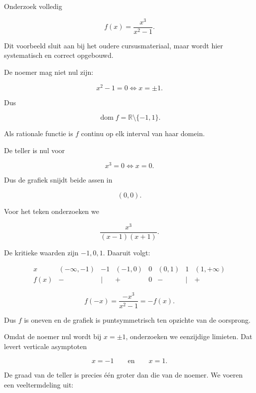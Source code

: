 \documentclass{ximera}
\begin{document}


Onderzoek volledig

\[
f(x)=\frac{x^3}{x^2-1}.
\]

Dit voorbeeld sluit aan bij het oudere cursusmateriaal, maar wordt hier
systematisch en correct opgebouwd.


De noemer mag niet nul zijn:

\[
x^2-1=0
\Longleftrightarrow
x=\pm1.
\]

Dus

\[
\boxed{\operatorname{dom}f=\mathbb{R}\setminus\{-1,1\}.}
\]

Als rationale functie is \(f\) continu op elk interval van haar domein.


De teller is nul voor

\[x^3=0\Longleftrightarrow x=0.\]

Dus de grafiek snijdt beide assen in

\[\boxed{(0,0)}.\]

Voor het teken onderzoeken we

\[
\frac{x^3}{(x-1)(x+1)}.
\]

De kritieke waarden zijn \(-1,0,1\). Daaruit volgt:

\[
\begin{array}{c|ccccccc}
x&(-\infty,-1)&-1&(-1,0)&0&(0,1)&1&(1,+\infty)\\
\hline
f(x)&-&\mid&+&0&-&\mid&+
\end{array}
\]


\[
f(-x)=\frac{-x^3}{x^2-1}=-f(x).
\]

Dus \(f\) is oneven en de grafiek is puntsymmetrisch ten opzichte van
de oorsprong.


Omdat de noemer nul wordt bij \(x=\pm1\), onderzoeken we eenzijdige
limieten. Dat levert verticale asymptoten

\[
\boxed{x=-1 \qquad\text{en}\qquad x=1.}
\]

De graad van de teller is precies één groter dan die van de noemer.
We voeren een veeltermdeling uit:
\end{document}
